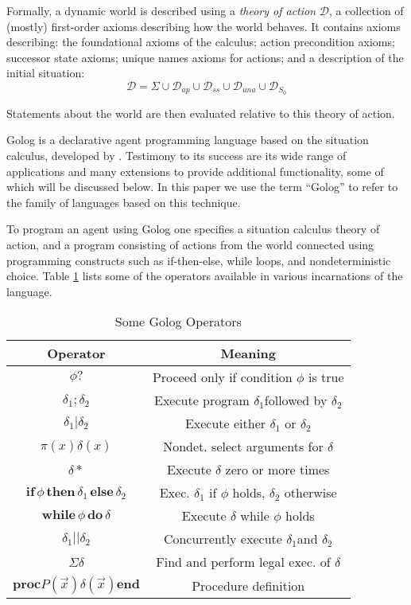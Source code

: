 \documentclass[letterpaper]{article}
\begin{document}
Formally, a dynamic world is described using a \emph{theory of action}
$\mathcal{D}$, a collection of (mostly) first-order axioms describing
how the world behaves. It contains axioms describing: the foundational
axioms of the calculus; action precondition axioms; successor state
axioms; unique names axioms for actions; and a description of the
initial situation:
\begin{equation}
\label{eqn:sc_action_theory}
\mathcal{D}=\Sigma\cup\mathcal{D}_{ap}\cup\mathcal{D}_{ss}\cup\mathcal{D}_{una}\cup\mathcal{D}_{S_{0}}
\end{equation}

Statements about the world are then evaluated relative to this theory
of action.

Golog is a declarative agent programming language based on the situation
calculus, developed by \cite{levesque97golog}. Testimony
to its success are its wide range of applications and many extensions
to provide additional functionality, some of which will be discussed below.
In this paper we use the term ``Golog'' to refer to the family
of languages based on this technique.

To program an agent using Golog one specifies a situation calculus
theory of action, and a program consisting of actions from the world
connected using programming constructs such as if-then-else, while
loops, and nondeterministic choice. Table \ref{tbl:Golog-Operators}
lists some of the operators available in various incarnations of
the language.

\begin{table}[t]
\begin{center}\begin{tabular}{|c|c|}
\hline 
Operator&
Meaning\tabularnewline
\hline
\hline 
$\phi?$&
Proceed only if condition $\phi$ is true\tabularnewline
\hline 
$\delta_{1};\delta_{2}$&
Execute program $\delta_{1}$followed by $\delta_{2}$\tabularnewline
\hline 
$\delta_{1}|\delta_{2}$&
Execute either $\delta_{1}$ or $\delta_{2}$\tabularnewline
\hline 
$\pi(x)\delta(x)$&
Nondet. select arguments for $\delta$\tabularnewline
\hline 
$\delta*$&
Execute $\delta$ zero or more times\tabularnewline
\hline 
$\mathbf{if}\,\phi\,\mathbf{then}\,\delta_{1}\,\mathbf{else}\,\delta_{2}$&
Exec. $\delta_{1}$ if $\phi$ holds, $\delta_{2}$ otherwise\tabularnewline
\hline 
$\mathbf{while\,}\phi\mathbf{\, do}\,\delta$&
Execute $\delta$ while $\phi$ holds\tabularnewline
\hline 
$\delta_{1}||\delta_{2}$&
Concurrently execute $\delta_{1}$and $\delta_{2}$\tabularnewline
\hline 
$\Sigma\delta$&
Find and perform legal exec. of $\delta$\tabularnewline
\hline 
$\mathbf{proc}P(\overrightarrow{x})\delta(\overrightarrow{x})\mathbf{end}$&
Procedure definition\tabularnewline
\hline
\end{tabular}\end{center}


\caption{Some Golog Operators\label{tbl:Golog-Operators}}
\end{table}
\end{document}
